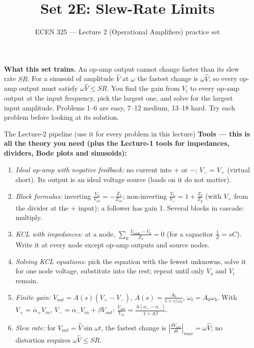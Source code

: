 \documentclass[11pt]{article}
\title{Set 2E: Slew-Rate Limits}
\author{ECEN 325 --- Lecture 2 (Operational Amplifiers) practice set}
\date{}
\begin{document}
\maketitle

\textbf{What this set trains.} An op-amp output cannot change faster than its slew rate $SR$. For a sinusoid of
amplitude $\hat V$ at $\omega$ the fastest change is $\omega\hat V$, so every op-amp output must satisfy
$\omega\hat V\le SR$. You find the gain from $V_i$ to every op-amp output at the input frequency, pick the largest
one, and solve for the largest input amplitude. Problems 1--6 are easy, 7--12 medium, 13--18 hard. Try each
problem before looking at its solution.


\begin{cardbox}{The Lecture-2 pipeline (use it for every problem in this lecture)}
\textbf{Tools --- this is all the theory you need (plus the Lecture-1 tools for impedances, dividers, Bode plots
and sinusoids):}
\begin{enumerate}[label=\textbf{T\arabic*},leftmargin=2.2em,itemsep=1pt]
\item \emph{Ideal op-amp with negative feedback:} no current into $+$ or $-$; $V_-=V_+$ (virtual short).
      Its output is an ideal voltage source (loads on it do not matter).
\item \emph{Block formulas:} inverting $\frac{V_o}{V_{in}}=-\frac{Z_f}{Z_{in}}$; non-inverting
      $\frac{V_o}{V_+}=1+\frac{Z_f}{Z_g}$ (with $V_+$ from the divider at the $+$ input); a follower has gain 1.
      Several blocks in cascade: multiply.
\item \emph{KCL with impedances:} at a node, $\sum_k \frac{V_{node}-V_k}{Z_k}=0$ (for a capacitor
      $\frac{1}{Z}=sC$). Write it at every node except op-amp outputs and source nodes.
\item \emph{Solving KCL equations:} pick the equation with the fewest unknowns, solve it for one node voltage,
      substitute into the rest; repeat until only $V_o$ and $V_i$ remain.
\item \emph{Finite gain:} $V_{out}=A(s)(V_+-V_-)$, $A(s)=\frac{A_0}{1+s/\omega_b}$, $\omega_t=A_0\omega_b$.
      With $V_+=\alpha_+V_{in}$, $V_-=\alpha_-V_{in}+\beta V_{out}$: $\frac{V_{out}}{V_{in}}=\frac{A(\alpha_+-\alpha_-)}{1+A\beta}$.
\item \emph{Slew rate:} for $V_{out}=\hat V\sin\omega t$, the fastest change is $\left|\frac{dV_{out}}{dt}\right|_{max}=\omega\hat V$;
      no distortion requires $\omega\hat V\le SR$.
\end{enumerate}

\end{cardbox}
\end{document}
